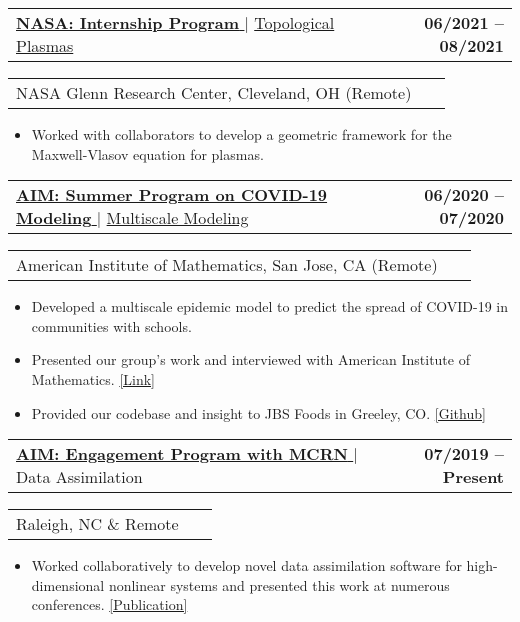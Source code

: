 \documentclass[letterpaper,11pt]{article}
\makeatletter
\newcommand{\accentcolor}[1]{\textcolor{accentcolor}{#1}}
\newcommand{\resumeItem}[1]{
  \item\small{
    {#1 \vspace{-2pt}}
  }
}
\newcommand{\resumeProjectHeading}[2]{
    \item
    \begin{tabular*}{1.001\textwidth}{l@{\extracolsep{\fill}}r}
      \small#1 & \textbf{\small #2}\\
    \end{tabular*}\vspace{-7pt}
}
\newcommand{\resumeItemListStart}{\begin{itemize}}
\newcommand{\resumeItemListEnd}{\end{itemize}\vspace{-5pt}}
\makeatother
\begin{document}
       \resumeProjectHeading
          {\href{https://intern.nasa.gov/}{\textbf{\large{NASA: Internship Program} \small{\raisebox{-0.1\height}\faExternalLink}}} $|$ \href{https://www.mathjobs.org/jobs/list/17245?rss}{\large{Topological Plasmas}}}{06/2021 -- 08/2021}
        \resumeProjectHeading{NASA Glenn Research Center, Cleveland, OH (Remote)}{~}
          \resumeItemListStart
            \resumeItem{\normalsize{Worked with collaborators to develop a geometric framework for the Maxwell-Vlasov equation for plasmas.}}
          \resumeItemListEnd
      \resumeProjectHeading{\href{https://aimath.org/workshops/upcoming/mcrn2020/}{\textbf{\large{AIM: Summer Program on COVID-19 Modeling} \small{\raisebox{-0.1\height}\faExternalLink}}} $|$ \href{https://mathcommunities.org/taking-aim-at-covid-19/}{\large{Multiscale Modeling}}}{06/2020 -- 07/2020}
        \resumeProjectHeading{American Institute of Mathematics, San Jose, CA (Remote)}{~}
          \resumeItemListStart
            \resumeItem{\normalsize{Developed a multiscale epidemic model to predict the spread of COVID-19 in communities with schools.}} \resumeItem{\normalsize{Presented our group's work and interviewed with American Institute of Mathematics. \href{https://mathcommunities.org/taking-aim-at-covid-19/}{\accentcolor{[Link]}}}}
			\resumeItem{\normalsize{Provided our codebase and insight to JBS Foods in Greeley, CO.} \href{https://github.com/clairevalva/mcrn_multi_DA}{\accentcolor{[Github]}}}
          \resumeItemListEnd

          \resumeProjectHeading
          {\href{https://aimath.org/workshops/upcoming/mcrn2019/}{\textbf{\large{AIM: Engagement Program with MCRN}} \href{https://www.sciencedirect.com/science/article/abs/pii/S0898122121002121}{\raisebox{-0.1\height}\faExternalLink }} $|$ \large{Data Assimilation}}{07/2019 -- Present}
        \resumeProjectHeading{Raleigh, NC \& Remote}{~}
          \resumeItemListStart
            \resumeItem{\normalsize{Worked collaboratively to develop novel data assimilation software for high-dimensional nonlinear systems and presented this work at numerous conferences. \href{https://www.sciencedirect.com/science/article/abs/pii/S0898122121002121}{\accentcolor{[Publication]}}}}
          \resumeItemListEnd
\end{document}
